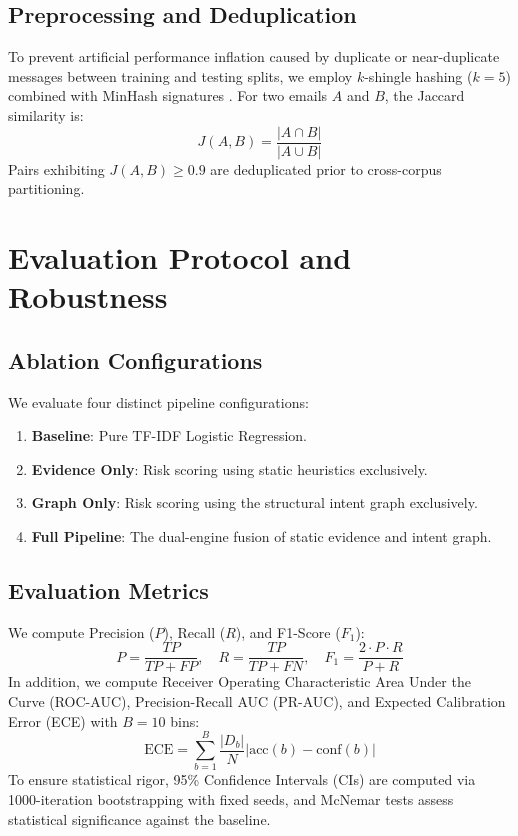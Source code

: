\documentclass{ieeeaccess}
\begin{document}
\subsection{Preprocessing and Deduplication}
To prevent artificial performance inflation caused by duplicate or near-duplicate messages between training and testing splits, we employ $k$-shingle hashing ($k=5$) combined with MinHash signatures \cite{b5}. For two emails $A$ and $B$, the Jaccard similarity is:
\begin{equation}
J(A, B) = \frac{|A \cap B|}{|A \cup B|}
\end{equation}
Pairs exhibiting $J(A, B) \ge 0.9$ are deduplicated prior to cross-corpus partitioning.

\section{Evaluation Protocol and Robustness}
\label{sec:evaluation}

\subsection{Ablation Configurations}
We evaluate four distinct pipeline configurations:
\begin{enumerate}
    \item \textbf{Baseline}: Pure TF-IDF Logistic Regression.
    \item \textbf{Evidence Only}: Risk scoring using static heuristics exclusively.
    \item \textbf{Graph Only}: Risk scoring using the structural intent graph exclusively.
    \item \textbf{Full Pipeline}: The dual-engine fusion of static evidence and intent graph.
\end{enumerate}

\subsection{Evaluation Metrics}
We compute Precision ($P$), Recall ($R$), and F1-Score ($F_1$):
\begin{equation}
P = \frac{TP}{TP + FP}, \quad R = \frac{TP}{TP + FN}, \quad F_1 = \frac{2 \cdot P \cdot R}{P + R}
\end{equation}
In addition, we compute Receiver Operating Characteristic Area Under the Curve (ROC-AUC), Precision-Recall AUC (PR-AUC), and Expected Calibration Error (ECE) \cite{b6} with $B=10$ bins:
\begin{equation}
\text{ECE} = \sum_{b=1}^{B} \frac{|D_b|}{N} \left| \text{acc}(b) - \text{conf}(b) \right|
\end{equation}
To ensure statistical rigor, 95\% Confidence Intervals (CIs) are computed via 1000-iteration bootstrapping with fixed seeds, and McNemar tests assess statistical significance against the baseline.
\end{document}
